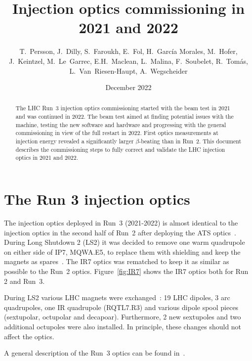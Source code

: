 \documentclass[a4paper]{cernatsnote}
\title{Injection optics commissioning in 2021 and 2022}
\author{ T.~Persson, J.~Dilly, S.~Faroukh, E.~Fol, H.~Garc\'ia Morales, M.~Hofer,
 J.~Keintzel, M.~Le~Garrec, E.H.~Maclean, L.~Malina,  F.~Soubelet, R.~Tom\'as, L.~Van~Riesen-Haupt,  A.~Wegscheider}
\date{December 2022}
\begin{document}
\maketitle
\begin{abstract}
The LHC Run~3 injection optics commissioning started with the beam test in 2021 and was continued in 2022.
The beam test aimed at finding potential issues with the machine, testing the new software and hardware and progressing with the general commissioning in view of the full restart in 2022.
First optics measurements at injection energy revealed a significantly larger $\beta$-beating than in Run~2.
This document describes the commissioning steps to fully correct and validate the LHC injection optics in 2021 and 2022.

\end{abstract}

\section{The Run 3 injection optics}
The injection optics deployed in Run~3 (2021-2022) is almost identical to the injection optics in the second half of Run~2 after deploying the ATS optics~\cite{ats_stephane}.
During Long Shutdown 2 (LS2) it was decided to remove one warm quadrupole on either side of IP7, MQWA.E5, to replace them with shielding and keep the magnets as spares~\cite{roderik}. The IR7 optics was rematched to
keep it as similar as possible to the Run~2 optics. Figure~\ref{fig:IR7} shows the IR7 optics both for Run 2 and Run~3. 

During LS2 various LHC magnets were exchanged~\cite{LS2,LS2a}:
19 LHC dipoles,
3 arc quadrupoles, one IR quadrupole (RQTL7.R3) and various dipole spool pieces (sextupolar, octupolar and decapoar).
Furthermore, 2 new sextupoles and two additional octupoles were also installed.
In principle, these changes should not affect the optics.

A general description of the Run~3 optics can be found in~\cite{run3}.
\end{document}
